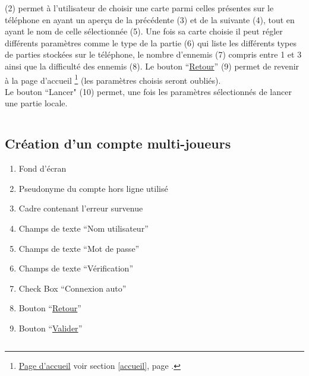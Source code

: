 \documentclass{report}
\begin{document}
		$\,$
		
		(2) permet à l'utilisateur de choisir une carte parmi celles présentes sur le
		téléphone en ayant un aperçu de la précédente (3) et de la suivante (4), tout
		en ayant le nom de celle sélectionnée (5). Une fois sa carte choisie il peut 
		régler différents paramètres comme le type de la partie (6) qui liste les
		différents types de parties stockées sur le téléphone, le nombre d'ennemis (7)
		compris entre 1 et 3 ainsi que la difficulté des ennemis (8).
		Le bouton ``\hyperlink{Page d'accueil}{Retour}'' (9) permet de revenir à la page d'accueil%
		\footnote[1]{
			\hyperlink{Page d'accueil}{Page d'accueil}
			\og voir section \ref{accueil}, page \pageref{accueil}.\fg
		}
		(les paramètres choisis seront oubliés).\\
		Le bouton ``Lancer" (10) permet, une fois les paramètres sélectionnés de
		lancer une partie locale.
		
		$\,$
	
\newpage

	\subsection{Création d'un compte multi-joueurs}
	
		\hypertarget{Creation compte multi-joueurs}{}
		\label{Creation compte multi-joueurs}
	
		
		
		\begin{enumerate}
		  \item Fond d'écran
		  \item Pseudonyme du compte hors ligne utilisé
		  \item Cadre contenant l'erreur survenue
		  \item Champs de texte ``Nom utilisateur''
		  \item Champs de texte ``Mot de passe''
		  \item Champs de texte ``Vérification''
		  \item Check Box ``Connexion auto''
		  \item Bouton ``\hyperlink{Connexion multi-joueurs}{Retour}''
		  \item Bouton ``\hyperlink{Accueil multi-joueurs}{Valider}''
		\end{enumerate}
		
		$\,$
		
\end{document}
